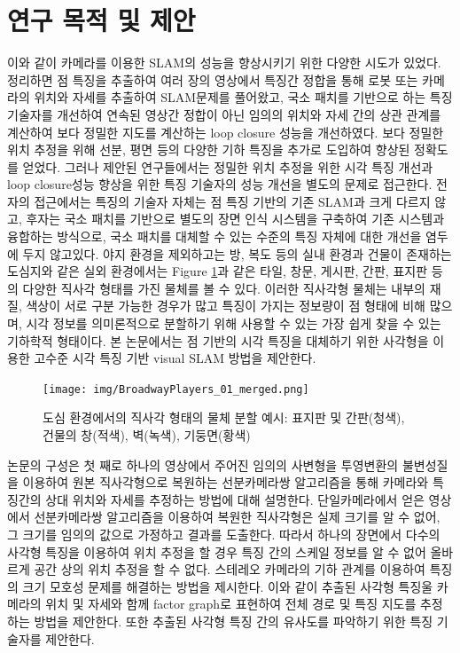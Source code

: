 \documentclass[master,korean,final]{cbnu-ecs}
\begin{document}
\section{연구 목적 및 제안}
이와 같이 카메라를 이용한 SLAM의 성능을 향상시키기 위한 다양한 시도가 있었다. 정리하면 점 특징을 추출하여 여러 장의 영상에서 특징간 정합을 통해 로봇 또는 카메라의 위치와 자세를 추출하여 SLAM문제를 풀어왔고, 국소 패치를 기반으로 하는 특징 기술자를 개선하여 연속된 영상간 정합이 아닌 임의의 위치와 자세 간의 상관 관계를 계산하여 보다 정밀한 지도를 계산하는 loop closure 성능을 개선하였다. 보다 정밀한 위치 추정을 위해 선분, 평면 등의 다양한 기하 특징을 추가로 도입하여 향상된 정확도를 얻었다.
그러나 제안된 연구들에서는 정밀한 위치 추정을 위한 시각 특징 개선과 loop closure성능 향상을 위한 특징 기술자의 성능 개선을 별도의 문제로 접근한다. 전자의 접근에서는 특징의 기술자 자체는 점 특징 기반의 기존 SLAM과 크게 다르지 않고, 후자는 국소 패치를 기반으로 별도의 장면 인식 시스템을 구축하여 기존 시스템과 융합하는 방식으로, 국소 패치를 대체할 수 있는 수준의 특징 자체에 대한 개선을 염두에 두지 않고있다. 
야지 환경을 제외하고는 방, 복도 등의 실내 환경과 건물이 존재하는 도심지와 같은 실외 환경에서는 Figure \ref{envexample}과 같은 타일, 창문, 게시판, 간판, 표지판 등의 다양한 직사각 형태를 가진 물체를 볼 수 있다. 이러한 직사각형 물체는 내부의 재질, 색상이 서로 구분 가능한 경우가 많고 특징이 가지는 정보량이 점 형태에 비해 많으며, 시각 정보를 의미론적으로 분할하기 위해 사용할 수 있는 가장 쉽게 찾을 수 있는 기하학적 형태이다. 본 논문에서는 점 기반의 시각 특징을 대체하기 위한 사각형을 이용한 고수준 시각 특징 기반 visual SLAM 방법을 제안한다.\newpage
\begin{figure}[!ht]
  \centering
	\texttt{[image: img/BroadwayPlayers\_01\_merged.png]}
  \caption{도심 환경에서의 직사각 형태의 물체 분할 예시: 표지판 및 간판(청색), 건물의 창(적색), 벽(녹색), 기둥면(황색)}
\label{envexample}
\end{figure}

\newpage
논문의 구성은 첫 째로 하나의 영상에서 주어진 임의의 사변형을 투영변환의 불변성질을 이용하여 원본 직사각형으로 복원하는 선분카메라쌍 알고리즘을 통해 카메라와 특징간의 상대 위치와 자세를 추정하는 방법에 대해 설명한다. 단일카메라에서 얻은 영상에서 선분카메라쌍 알고리즘을 이용하여 복원한 직사각형은 실제 크기를 알 수 없어, 그 크기를 임의의 값으로 가정하고 결과를 도출한다. 따라서 하나의 장면에서 다수의 사각형 특징을 이용하여 위치 추정을 할 경우 특징 간의 스케일 정보를 알 수 없어 올바르게 공간 상의 위치 추정을 할 수 없다. 스테레오 카메라의 기하 관계를 이용하여 특징의 크기 모호성 문제를 해결하는 방법을 제시한다. 이와 같이 추출된 사각형 특징울 카메라의 위치 및 자세와 함께 factor graph로 표현하여 전체 경로 및 특징 지도를 추정하는 방법을 제안한다. 또한 추출된 사각형 특징 간의 유사도를 파악하기 위한 특징 기술자를 제안한다. 
\end{document}
